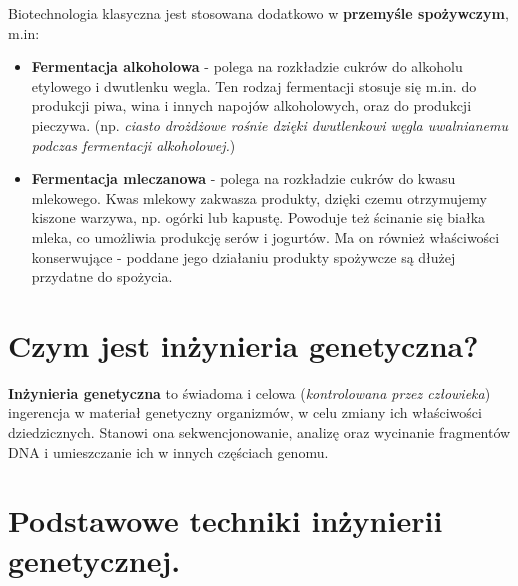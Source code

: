 \documentclass[a4paper, twocolumn]{article}
\begin{document}
Biotechnologia klasyczna jest stosowana dodatkowo w \textbf{przemyśle spożywczym}, m.in:
\begin{itemize}
	\item \textbf{Fermentacja alkoholowa} - polega na rozkładzie cukrów do alkoholu etylowego i dwutlenku wegla.
		Ten rodzaj fermentacji stosuje się m.in. do produkcji piwa, wina i innych napojów alkoholowych, oraz do produkcji pieczywa.
		(np. \textit{ciasto drożdżowe rośnie dzięki dwutlenkowi węgla uwalnianemu podczas fermentacji alkoholowej.})
	\item \textbf{Fermentacja mleczanowa} - polega na rozkładzie cukrów do kwasu mlekowego.
		Kwas mlekowy zakwasza produkty, dzięki czemu otrzymujemy kiszone warzywa, np. ogórki lub kapustę.
		Powoduje też ścinanie się białka mleka, co umożliwia produkcję serów i jogurtów.
		Ma on również właściwości konserwujące - poddane jego działaniu produkty spożywcze są dłużej przydatne do spożycia.
\end{itemize}
\section{Czym jest inżynieria genetyczna?}%
\label{sec:Czym jest inżynieria genetyczna?}
\textbf{Inżynieria genetyczna} to świadoma i celowa (\textit{kontrolowana przez człowieka}) ingerencja w materiał genetyczny organizmów, w celu zmiany ich właściwości dziedzicznych.
Stanowi ona sekwencjonowanie, analizę oraz wycinanie fragmentów DNA i umieszczanie ich w innych częściach genomu.
\section{Podstawowe techniki inżynierii genetycznej.}%
\label{sec:Podstawowe techniki inżynierii genetycznej.}
\end{document}

